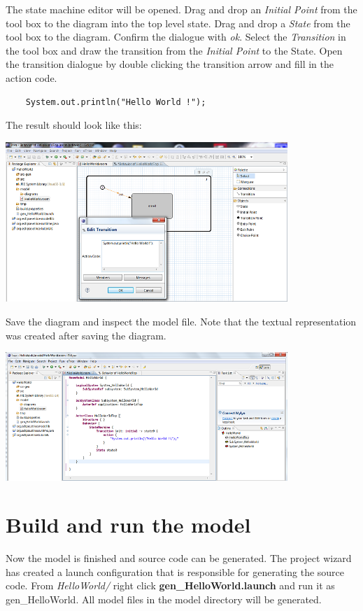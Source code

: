 The state machine editor will be opened. Drag and drop an \textit{Initial Point} from the tool box to the 
diagram into the top level state. Drag and drop a \textit{State} from the tool box to the diagram. Confirm 
the dialogue with \textit{ok}. Select the \textit{Transition} in the tool box and draw the transition from 
the \textit{Initial Point} to the State. Open the transition dialogue by double clicking the transition 
arrow and fill in the action code.

\begin{verbatim}
	System.out.println("Hello World !");
\end{verbatim}
 
The result should look like this:

\includegraphics[width=0.8\textwidth]{images/015-HelloWorld04.png}

Save the diagram and inspect the model file. Note that the textual representation was created after saving 
the diagram.

\includegraphics[width=0.8\textwidth]{images/015-HelloWorld05.png}


\section{Build and run the model}

Now the model is finished and source code can be generated. The project wizard has created a launch 
configuration that is responsible for generating the source code. From \textit{HelloWorld/} right click 
\textbf{gen\_HelloWorld.launch} and run it as gen\_HelloWorld. All model files in the model directory will 
be generated.

